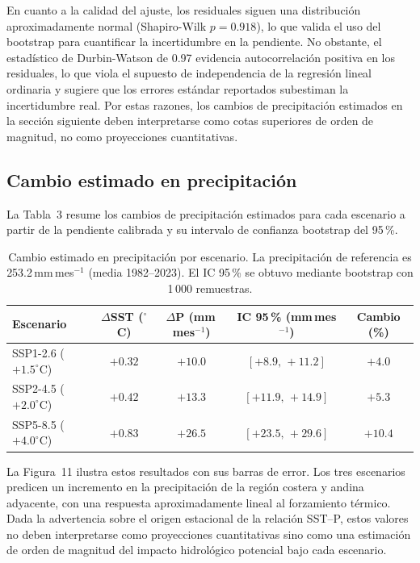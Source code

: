 \documentclass[12pt, a4paper]{article}
\begin{document}
En cuanto a la calidad del ajuste, los residuales siguen una distribuci\'on 
aproximadamente normal (Shapiro-Wilk $p = 0.918$), lo que valida el uso del bootstrap 
para cuantificar la incertidumbre en la pendiente. No obstante, el estad\'istico de 
Durbin-Watson de 0.97 evidencia autocorrelaci\'on positiva en los residuales, lo que 
viola el supuesto de independencia de la regresi\'on lineal ordinaria y sugiere que los 
errores est\'andar reportados subestiman la incertidumbre real. Por estas razones, los 
cambios de precipitaci\'on estimados en la secci\'on siguiente deben interpretarse como 
cotas superiores de orden de magnitud, no como proyecciones cuantitativas.

\subsection{Cambio estimado en precipitaci\'on}

La Tabla~3 resume los cambios de precipitaci\'on estimados para cada escenario a partir 
de la pendiente calibrada y su intervalo de confianza bootstrap del 95\,\%.

\begin{table}[h]
	\centering
	\caption{Cambio estimado en precipitaci\'on por escenario. La precipitaci\'on 
		de referencia es 253.2\,mm\,mes$^{-1}$ (media 1982--2023). El IC 95\,\% se 
		obtuvo mediante bootstrap con 1\,000 remuestras.}
	\label{tab:delta_p}
	\begin{tabular}{lcccc}
		\hline
		Escenario & $\Delta$SST ($^{\circ}$C) & $\Delta$P (mm\,mes$^{-1}$) & 
		IC 95\,\% (mm\,mes$^{-1}$) & Cambio (\%) \\
		\hline
		SSP1-2.6 ($+1.5^{\circ}$C) & $+0.32$ & $+10.0$ & $[+8.9,\,+11.2]$  & $+4.0$ \\
		SSP2-4.5 ($+2.0^{\circ}$C) & $+0.42$ & $+13.3$ & $[+11.9,\,+14.9]$ & $+5.3$ \\
		SSP5-8.5 ($+4.0^{\circ}$C) & $+0.83$ & $+26.5$ & $[+23.5,\,+29.6]$ & $+10.4$ \\
		\hline
	\end{tabular}
\end{table}

La Figura~11 ilustra estos resultados con sus barras de error. Los tres escenarios 
predicen un incremento en la precipitaci\'on de la regi\'on costera y andina adyacente, 
con una respuesta aproximadamente lineal al forzamiento t\'ermico. Dada la advertencia 
sobre el origen estacional de la relaci\'on SST--P, estos valores no deben interpretarse 
como proyecciones cuantitativas sino como una estimaci\'on de orden de magnitud del 
impacto hidrol\'ogico potencial bajo cada escenario.
\end{document}
